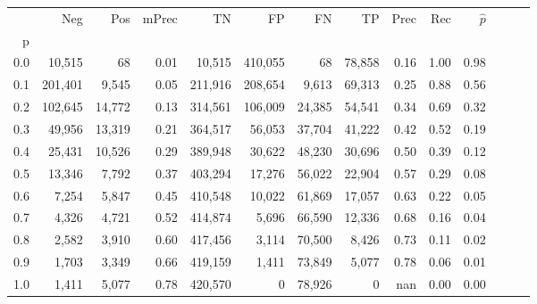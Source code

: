 \begin{tabular}{rrrrrrrrrrrrrr}
\toprule
{} &      Neg &     Pos & mPrec &       TN &       FP &      FN &      TP &  Prec &   Rec & $\hat{p}$ \\
p   &          &         &       &          &          &         &         &       &       &           \\
\midrule
0.0 &   10,515 &      68 &  0.01 &   10,515 &  410,055 &      68 &  78,858 &  0.16 &  1.00 &      0.98 \\
0.1 &  201,401 &   9,545 &  0.05 &  211,916 &  208,654 &   9,613 &  69,313 &  0.25 &  0.88 &      0.56 \\
0.2 &  102,645 &  14,772 &  0.13 &  314,561 &  106,009 &  24,385 &  54,541 &  0.34 &  0.69 &      0.32 \\
0.3 &   49,956 &  13,319 &  0.21 &  364,517 &   56,053 &  37,704 &  41,222 &  0.42 &  0.52 &      0.19 \\
0.4 &   25,431 &  10,526 &  0.29 &  389,948 &   30,622 &  48,230 &  30,696 &  0.50 &  0.39 &      0.12 \\
0.5 &   13,346 &   7,792 &  0.37 &  403,294 &   17,276 &  56,022 &  22,904 &  0.57 &  0.29 &      0.08 \\
0.6 &    7,254 &   5,847 &  0.45 &  410,548 &   10,022 &  61,869 &  17,057 &  0.63 &  0.22 &      0.05 \\
0.7 &    4,326 &   4,721 &  0.52 &  414,874 &    5,696 &  66,590 &  12,336 &  0.68 &  0.16 &      0.04 \\
0.8 &    2,582 &   3,910 &  0.60 &  417,456 &    3,114 &  70,500 &   8,426 &  0.73 &  0.11 &      0.02 \\
0.9 &    1,703 &   3,349 &  0.66 &  419,159 &    1,411 &  73,849 &   5,077 &  0.78 &  0.06 &      0.01 \\
1.0 &    1,411 &   5,077 &  0.78 &  420,570 &        0 &  78,926 &       0 &   nan &  0.00 &      0.00 \\
\bottomrule
\end{tabular}
